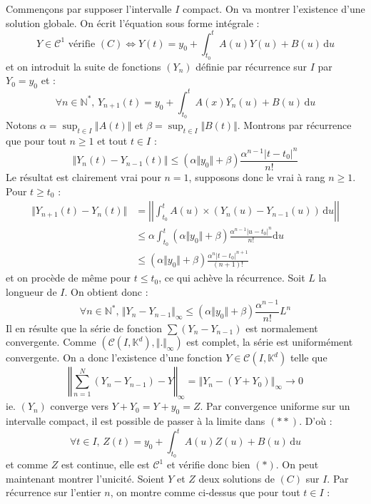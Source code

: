 	\begin{demonstration}
		Commençons par supposer l'intervalle $I$ compact. On va montrer l'existence d'une solution globale. On écrit l'équation sous forme intégrale :
		\[ Y \in \mathcal{C}^1 \text{ vérifie } (C) \iff Y(t) = y_0 + \int_{t_0}^t A(u) Y(u) + B(u) \, \mathrm{d}u \tag{$*$} \]
		et on introduit la suite de fonctions $(Y_n)$ définie par récurrence sur $I$ par $Y_0 = y_0$ et :
		\[ \forall n \in \mathbb{N}^*, \, Y_{n+1}(t) = y_0 + \int_{t_0}^t A(x) Y_n(u) + B(u) \, \mathrm{d}u \tag{$**$} \]
		Notons $\alpha = \sup_{t \in I} \Vert A(t) \Vert$ et $\beta = \sup_{t \in I} \Vert B(t) \Vert$. Montrons par récurrence que pour tout $n \geq 1$ et tout $t \in I$ :
		\[ \Vert Y_n(t) - Y_{n-1}(t) \Vert \leq (\alpha \Vert y_0 \Vert + \beta) \frac{\alpha^{n-1} |t-t_0|^n}{n!} \]
		Le résultat est clairement vrai pour $n = 1$, supposons donc le vrai à rang $n \geq 1$. Pour $t \geq t_0$ :
		\begin{align*}
			\Vert Y_{n+1}(t) - Y_n(t) \Vert &= \left| \left| \int_{t_0}^t A(u) \times (Y_n(u) - Y_{n-1}(u)) \, \mathrm{d}u \right| \right| \\
			&\leq \alpha \int_{t_0}^t (\alpha \Vert y_0 \Vert + \beta) \frac{\alpha^{n-1} |u-t_0|^n}{n!} \mathrm{d}u \\
			&\leq (\alpha \Vert y_0 \Vert + \beta) \frac{\alpha^n |t-t_0|^{n+1}}{(n+1)!}
		\end{align*}
		et on procède de même pour $t \leq t_0$, ce qui achève la récurrence.
		\newpar
		Soit $L$ la longueur de $I$. On obtient donc :
		\[ \forall n \in \mathbb{N}^*, \, \Vert Y_n - Y_{n-1} \Vert_{\infty} \leq (\alpha \Vert y_0 \Vert + \beta) \frac{\alpha^{n-1}}{n!} L^n \]
		Il en résulte que la série de fonction $\sum (Y_n - Y_{n-1})$ est normalement convergente. Comme $(\mathcal{C} (I, \mathbb{K}^d), \Vert . \Vert_{\infty})$ est complet, la série est uniformément convergente. On a donc l'existence d'une fonction $Y \in \mathcal{C} (I, \mathbb{K}^d)$ telle que
		\[ \left \Vert \sum_{n=1}^N (Y_n - Y_{n-1}) - Y \right \Vert_\infty = \left \Vert Y_n - (Y + Y_0) \right \Vert_\infty \longrightarrow 0 \]
		ie. $(Y_n)$ converge vers $Y + Y_0 = Y + y_0 = Z$. Par convergence uniforme sur un intervalle compact, il est possible de passer à la limite dans $(**)$. D'où :
		\[ \forall t \in I, \, Z(t) = y_0 + \int_{t_0}^t A(u) Z(u) + B(u) \, \mathrm{d}u \]
		et comme $Z$ est continue, elle est $\mathcal{C}^1$ et vérifie donc bien $(*)$.
		\newpar
		On peut maintenant montrer l'unicité. Soient $Y$ et $Z$ deux solutions de $(C)$ sur $I$. Par récurrence sur l'entier $n$, on montre comme ci-dessus que pour tout $t \in I$ :

\end{demonstration}

